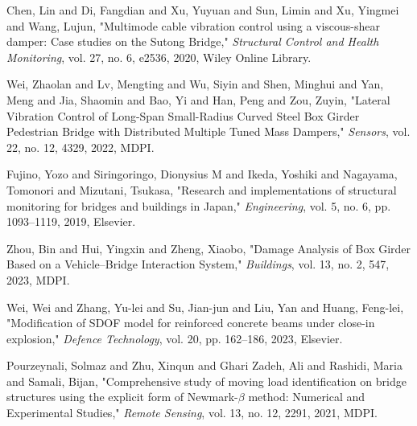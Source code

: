 \documentclass[conference]{IEEEtran}
\begin{document}
\begin{thebibliography}{100}
Chen, Lin and Di, Fangdian and Xu, Yuyuan and Sun, Limin and Xu, Yingmei and Wang, Lujun,
"Multimode cable vibration control using a viscous-shear damper: Case studies on the Sutong Bridge," 
\textit{Structural Control and Health Monitoring}, vol. 27, no. 6, e2536, 2020, Wiley Online Library.

Wei, Zhaolan and Lv, Mengting and Wu, Siyin and Shen, Minghui and Yan, Meng and Jia, Shaomin and Bao, Yi and Han, Peng and Zou, Zuyin,
"Lateral Vibration Control of Long-Span Small-Radius Curved Steel Box Girder Pedestrian Bridge with Distributed Multiple Tuned Mass Dampers," 
\textit{Sensors}, vol. 22, no. 12, 4329, 2022, MDPI.

Fujino, Yozo and Siringoringo, Dionysius M and Ikeda, Yoshiki and Nagayama, Tomonori and Mizutani, Tsukasa,
"Research and implementations of structural monitoring for bridges and buildings in Japan," 
\textit{Engineering}, vol. 5, no. 6, pp. 1093--1119, 2019, Elsevier.

Zhou, Bin and Hui, Yingxin and Zheng, Xiaobo,
"Damage Analysis of Box Girder Based on a Vehicle--Bridge Interaction System," 
\textit{Buildings}, vol. 13, no. 2, 547, 2023, MDPI.

Wei, Wei and Zhang, Yu-lei and Su, Jian-jun and Liu, Yan and Huang, Feng-lei,
"Modification of SDOF model for reinforced concrete beams under close-in explosion," 
\textit{Defence Technology}, vol. 20, pp. 162--186, 2023, Elsevier.

Pourzeynali, Solmaz and Zhu, Xinqun and Ghari Zadeh, Ali and Rashidi, Maria and Samali, Bijan,
"Comprehensive study of moving load identification on bridge structures using the explicit form of Newmark-$\beta$ method: Numerical and Experimental Studies," 
\textit{Remote Sensing}, vol. 13, no. 12, 2291, 2021, MDPI.



\end{thebibliography}
\end{document}
